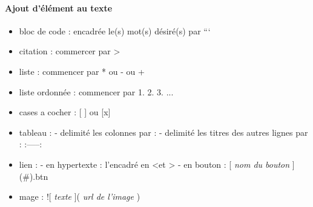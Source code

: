 \paragraph{Ajout d'élément au texte}
\begin{itemize}
	\item bloc de code : encadrée le(s) mot(s) désiré(s) par ```
	\item citation : commercer par \textgreater
	\item liste : commencer par * ou - ou +
	\item liste ordonnée : commencer par 1. 2. 3. ...
	\item cases a cocher : [ ] ou [x]
	\item tableau : 
		- delimité les colonnes par : \textbar
		- delimité les titres des autres lignes par : :-----:
	\item lien : 
		- en hypertexte : l'encadré en \textless et \textgreater
		- en bouton : [ \textit{nom du bouton} ](\#){.btn }
	\item mage : ![ \textit{texte} ]( \textit{url de l'image} )
\end{itemize}
